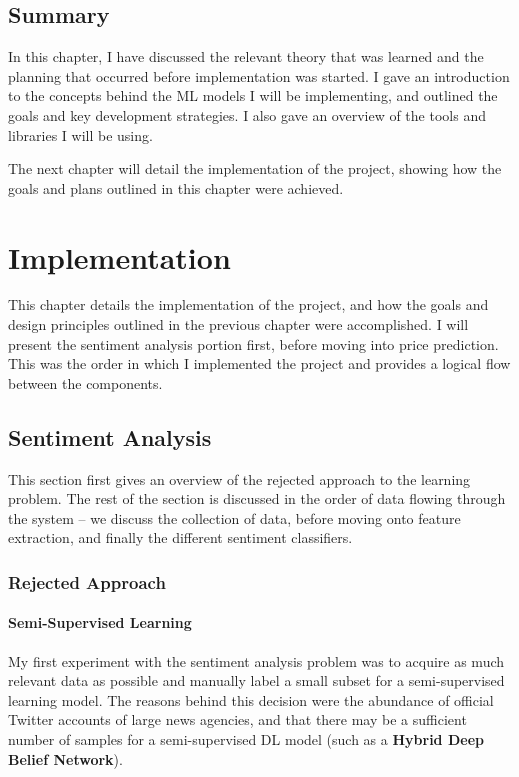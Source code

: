 \documentclass[12pt,a4paper,twoside,openright]{report}
\begin{document}
\section{Summary}
\label{sec:prepSumm}

In this chapter, I have discussed the relevant theory that was learned and the planning
that occurred before implementation was started. I gave an introduction to the concepts
behind the ML models I will be implementing, and outlined the goals and
key development strategies. I also gave an overview of the tools and libraries I
will be using.

The next chapter will detail the implementation of the project, showing how the goals and
plans outlined in this chapter were achieved.

\chapter{Implementation}
\label{sec:imp}

This chapter details the implementation of the project, and how the goals and
design principles outlined in the previous chapter were accomplished. I will
present the sentiment analysis portion first, before moving into price
prediction. This was the order in which I implemented the project and provides a logical flow between the components.

\section{Sentiment Analysis}
\label{sec:impSenti}
This section first gives an overview of the rejected approach to the
learning problem. The rest of the section is discussed in the order of data flowing 
through the system --
we discuss the collection of data, before
moving onto feature extraction, and finally the different sentiment classifiers.

\subsection{Rejected Approach}
\label{sec:impFailed}

\subsubsection{Semi-Supervised Learning}
\label{sec:semi}
My first experiment with the sentiment analysis problem was to
acquire as much relevant data as possible and manually label a small subset
for a semi-supervised learning model. The reasons behind this decision
were the abundance of official Twitter accounts of large news
agencies, and that there may be a sufficient number of samples for a
semi-supervised DL model (such as a \textbf{Hybrid Deep Belief Network}\cite{Zhou14}).
\end{document}
